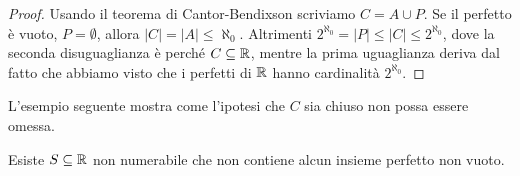 \begin{proof}
	Usando il teorema di Cantor-Bendixson scriviamo $C = A \cup P$. Se il perfetto \`e vuoto, $P = \emptyset$, allora $|C| = |A| \leq \aleph_0$.
	Altrimenti $2^{\aleph_0} = |P| \leq |C| \leq 2^{\aleph_0}$, dove la seconda disuguaglianza \`e perch\'e $C \subseteq \mathbb R$, mentre la prima uguaglianza 
	deriva dal fatto che abbiamo visto che i perfetti di $\mathbb R$ hanno cardinalit\`a $2^{\aleph_0}$.
\end{proof}

L'esempio seguente mostra come l'ipotesi che $C$ sia chiuso non possa essere omessa.

\begin{example}
	Esiste $S \subseteq \mathbb R$ non numerabile che non contiene alcun insieme perfetto non vuoto.
\end{example}

